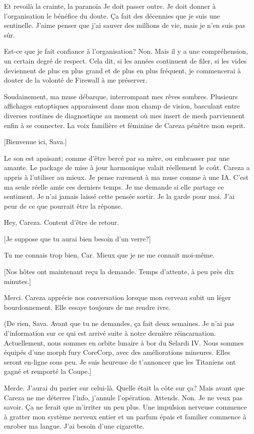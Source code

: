 Et revoilà la crainte, la paranoïa Je doit passer outre. Je doit donner à l'organisation le bénéfice du doute. Ça fait des décennies que je suis une sentinelle. J'aime penser que j'ai sauver des millions de vie, mais je n'en suis pas sûr. 

Est-ce que je fait confiance à l'organisation? Non. Mais il y a une compréhension, un certain degré de respect. Cela dit, si les années continuent de filer, si les vides deviennent de plus en plus grand et de plus en plus fréquent, je commencerai à douter de la volonté de Firewall à me préserver. 

Soudainement, ma muse débarque, interrompant mes rêves sombres. Plusieurs affichages entoptiques apparaissent dans mon champ de vision, basculant entre diverses routines de diagnostique au moment où mes insert de mesh parviennent enfin à se connecter. La voix familière et féminine de Careza pénètre mon esprit. 

[Bienvenue ici, Sava.] 

Le son est apaisant; comme d'être bercé par sa mère, ou embrasser par une amante. Le package de mise à jour harmonique valait réellement le coût. Careza a appris à l'utiliser au mieux. Je pense rarement à ma muse comme à une IA. C'est ma seule réelle amie ces derniers temps. Je me demande si elle partage ce sentiment. Je n'ai jamais laissé cette pensée sortir. Je la garde pour moi. J'ai peur de ce que pourrait être la réponse. 

Hey, Careza. Content d'être de retour. 

[Je suppose que tu aurai bien besoin d'un verre?] 

Tu me connais trop bien, Car. Mieux que je ne me connait moi-même. 

[Nos hôtes ont maintenant reçu la demande. Temps d'attente, à peu près dix minutes.] 

Merci. Careza apprécie nos conversation lorsque mon cerveau subit un léger bourdonnement. Elle essaye toujours de me rendre ivre. 

(De rien, Sava. Avant que tu ne demandes, ça fait deux semaines. Je n'ai pas d'information sur ce qui est arrivé suite à notre dernière réincarnation. Actuellement, nous sommes en orbite lunaire à bor du Selardi IV. Nous sommes équipés d'une morph fury CoreCorp, avec des améliorations mineures. Elles seront en-ligne sous peu. Je suis heureuse de t'annoncer que les Titaniens ont gagné et remporté la Coupe.] 

Merde. J'aurai du parier sur celui-là. Quelle était la côte sur ça? Mais avant que Careza ne me déterres l'info, j'annule l'opération. Attends. Non. Je ne veux pas savoir. Ça ne ferait que m'irriter un peu plus. Une impulsion nerveuse commence à gratter mon système nerveux entier et un parfum épais et familier commence à enrober ma langue. J'ai besoin d'une cigarette. 

